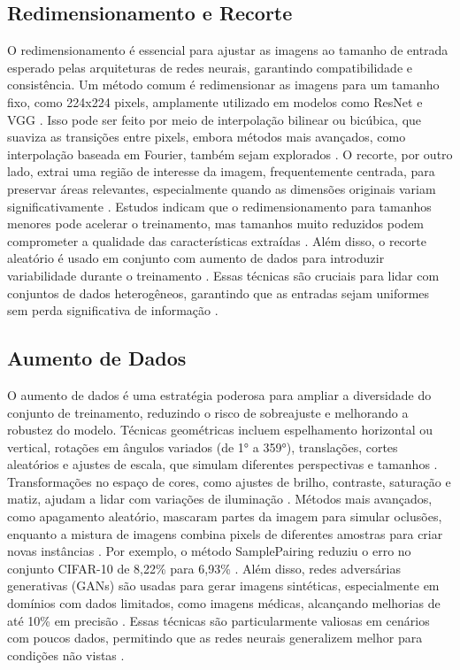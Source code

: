 \subsection{Redimensionamento e Recorte}
O redimensionamento é essencial para ajustar as imagens ao tamanho de entrada esperado pelas arquiteturas de redes neurais, garantindo compatibilidade e consistência. Um método comum é redimensionar as imagens para um tamanho fixo, como 224x224 pixels, amplamente utilizado em modelos como ResNet e VGG \cite{chen2023robustness}. Isso pode ser feito por meio de interpolação bilinear ou bicúbica, que suaviza as transições entre pixels, embora métodos mais avançados, como interpolação baseada em Fourier, também sejam explorados \cite{dennanni2019resizing}. O recorte, por outro lado, extrai uma região de interesse da imagem, frequentemente centrada, para preservar áreas relevantes, especialmente quando as dimensões originais variam significativamente \cite{sciencedirect2023normalization}. Estudos indicam que o redimensionamento para tamanhos menores pode acelerar o treinamento, mas tamanhos muito reduzidos podem comprometer a qualidade das características extraídas \cite{sabottke2020effect}. Além disso, o recorte aleatório é usado em conjunto com aumento de dados para introduzir variabilidade durante o treinamento \cite{nalepa2022data}. Essas técnicas são cruciais para lidar com conjuntos de dados heterogêneos, garantindo que as entradas sejam uniformes sem perda significativa de informação \cite{chen2023robustness}.

\subsection{Aumento de Dados}
O aumento de dados é uma estratégia poderosa para ampliar a diversidade do conjunto de treinamento, reduzindo o risco de sobreajuste e melhorando a robustez do modelo. Técnicas geométricas incluem espelhamento horizontal ou vertical, rotações em ângulos variados (de 1° a 359°), translações, cortes aleatórios e ajustes de escala, que simulam diferentes perspectivas e tamanhos \cite{shorten2019survey}. Transformações no espaço de cores, como ajustes de brilho, contraste, saturação e matiz, ajudam a lidar com variações de iluminação \cite{shorten2019survey}. Métodos mais avançados, como apagamento aleatório, mascaram partes da imagem para simular oclusões, enquanto a mistura de imagens combina pixels de diferentes amostras para criar novas instâncias \cite{shorten2019survey}. Por exemplo, o método SamplePairing reduziu o erro no conjunto CIFAR-10 de 8,22\% para 6,93\% \cite{shorten2019survey}. Além disso, redes adversárias generativas (GANs) são usadas para gerar imagens sintéticas, especialmente em domínios com dados limitados, como imagens médicas, alcançando melhorias de até 10\% em precisão \cite{shorten2019survey}. Essas técnicas são particularmente valiosas em cenários com poucos dados, permitindo que as redes neurais generalizem melhor para condições não vistas \cite{nalepa2022data}.

